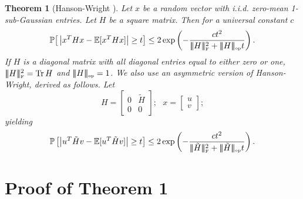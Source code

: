 \documentclass{article} %
\newcommand{\abs}[1]{\left|#1\right|}
\DeclareMathOperator{\Tr}{Tr}
\newtheorem{theorem}{Theorem}
\newcommand{\matsnorm}[2]{|\!|\!| #1 | \! | \!|_{{#2}}}
\newcommand{\fronorm}[1]{\ensuremath{\matsnorm{#1}{\tiny{\mbox{F}}}}}
\newcommand{\opnorm}[1]{\ensuremath{\matsnorm{#1}{\tiny{\mbox{op}}}}}
\newcommand{\EE}{\ensuremath{{\mathbb{E}}}}
\newcommand{\Prob}{\ensuremath{{\mathbb{P}}}}
\newcommand{\1}{\ensuremath{{\sf (i)}}}
\newcommand{\2}{\ensuremath{{\sf (ii)}}}
\newcommand{\3}{\ensuremath{{\sf (iii)}}}
\newcommand{\4}{\ensuremath{{\sf (iv)}}}
\newcommand{\5}{\ensuremath{{\sf (v)}}}
\newcommand{\6}{\ensuremath{{\sf (vi)}}}
\begin{document}
\begin{theorem}[Hanson-Wright \citep{boucheronbook}]\label{thm:hanson-wright}
    Let $x$ be a random vector with i.i.d. zero-mean 1-sub-Gaussian entries. Let $H$ be a square matrix. Then for a universal constant $c$
    \begin{equation*}
        \Prob\big[\abs{x^THx - \EE[x^THx]} \geq t\big] \leq 2\exp\left(- \frac{ct^2}{\fronorm{H}^2 + \opnorm{H}t}\right) .
    \end{equation*}
    If $H$ is a diagonal matrix with all diagonal entries equal to either zero or one, $\fronorm{H}^2 = \Tr{H}$ and $\opnorm{H} = 1$.
    We also use an asymmetric version of Hanson-Wright, derived as follows. Let 
    \begin{equation*}
        H = \begin{bmatrix}
            0 & \tilde H \\ 0 & 0 
        \end{bmatrix}; ~~~ x = \begin{bmatrix}
            u\\ v
        \end{bmatrix} ;  
    \end{equation*}
    yielding 
    \begin{equation*}
        \Prob\left[\abs{u^T\tilde Hv - \EE[u^T\tilde Hv]} \geq t\right] \leq 2\exp\left(- \frac{ct^2}{\fronorm{\tilde H}^2 + \opnorm{\tilde H}t}\right) .
    \end{equation*}
\end{theorem}



\section{Proof of Theorem 1}
\end{document}
